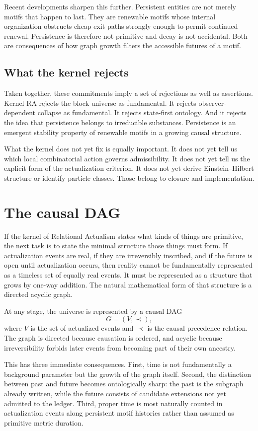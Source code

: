 \documentclass[11pt]{article}
\begin{document}
Recent developments sharpen this further. Persistent entities are not merely motifs that happen to last. They are renewable motifs whose internal organization obstructs cheap exit paths strongly enough to permit continued renewal. Persistence is therefore not primitive and decay is not accidental. Both are consequences of how graph growth filters the accessible futures of a motif.

\subsection{What the kernel rejects}
Taken together, these commitments imply a set of rejections as well as assertions. Kernel RA rejects the block universe as fundamental. It rejects observer-dependent collapse as fundamental. It rejects state-first ontology. And it rejects the idea that persistence belongs to irreducible substances. Persistence is an emergent stability property of renewable motifs in a growing causal structure.

What the kernel does not yet fix is equally important. It does not yet tell us which local combinatorial action governs admissibility. It does not yet tell us the explicit form of the actualization criterion. It does not yet derive Einstein--Hilbert structure or identify particle classes. Those belong to closure and implementation.

\section{The causal DAG}\label{sec:dag}
If the kernel of Relational Actualism states what kinds of things are primitive, the next task is to state the minimal structure those things must form. If actualization events are real, if they are irreversibly inscribed, and if the future is open until actualization occurs, then reality cannot be fundamentally represented as a timeless set of equally real events. It must be represented as a structure that grows by one-way addition. The natural mathematical form of that structure is a directed acyclic graph.

At any stage, the universe is represented by a causal DAG
\[
G=(V,\prec),
\]
where $V$ is the set of actualized events and $\prec$ is the causal precedence relation. The graph is directed because causation is ordered, and acyclic because irreversibility forbids later events from becoming part of their own ancestry.

This has three immediate consequences. First, time is not fundamentally a background parameter but the growth of the graph itself. Second, the distinction between past and future becomes ontologically sharp: the past is the subgraph already written, while the future consists of candidate extensions not yet admitted to the ledger. Third, proper time is most naturally counted in actualization events along persistent motif histories rather than assumed as primitive metric duration.
\end{document}
